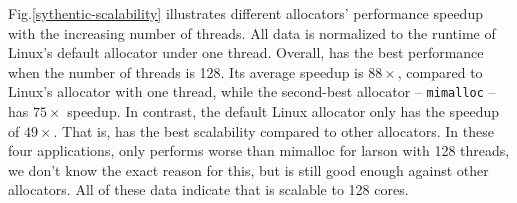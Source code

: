 Fig.\ref{sythentic-scalability} illustrates different allocators' performance speedup with the increasing number of threads. All data is normalized to the runtime of Linux's default allocator under one thread. Overall, \NM{} has the best performance when the number of threads is 128. Its average speedup is $88\times$, compared to Linux's allocator with one thread, while the second-best allocator -- \texttt{mimalloc} -- has $75\times$ speedup. In contrast, the default Linux allocator only has the speedup of $49\times$. That is, \NM{} has the best scalability compared to other allocators.
In these four applications, \NM{} only performs worse than mimalloc for larson with 128 threads, we don't know the exact reason for this, but \NM{} is still good enough against other allocators.
All of these data indicate that \NM{} is scalable to 128 cores. 





